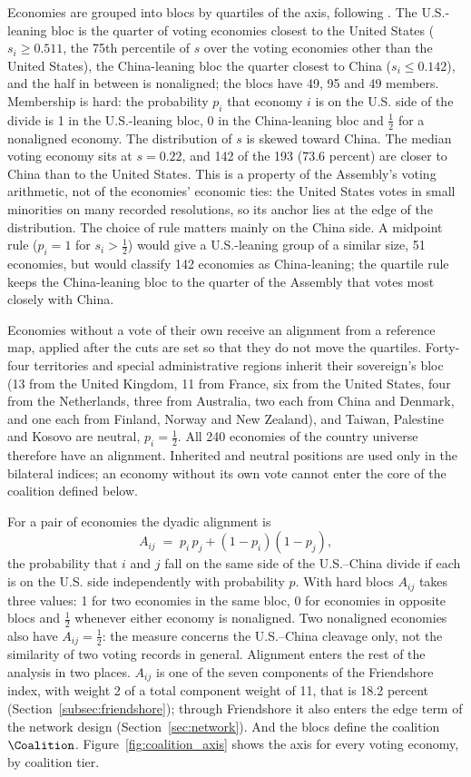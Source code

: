Economies are grouped into blocs by quartiles of the axis, following \citet{gopinath2025changing}.
The U.S.-leaning bloc is the quarter of voting economies closest to the United States
($s_i\geq 0.511$, the 75th percentile of $s$ over the voting economies other than the United
States), the China-leaning bloc the quarter closest to China ($s_i\leq 0.142$), and the half in
between is nonaligned; the blocs have 49, 95 and 49 members. Membership is hard: the probability
$p_i$ that economy $i$ is on the U.S. side of the divide is 1 in the U.S.-leaning bloc, 0 in the
China-leaning bloc and $\tfrac12$ for a nonaligned economy. The distribution of $s$ is skewed
toward China. The median voting economy sits at $s=0.22$, and 142 of the 193 (73.6 percent) are
closer to China than to the United States. This is a property of the Assembly's voting
arithmetic, not of the economies' economic ties: the United States votes in small minorities on
many recorded resolutions, so its anchor lies at the edge of the distribution. The choice of rule
matters mainly on the China side. A midpoint rule ($p_i=1$ for $s_i>\tfrac12$) would give a
U.S.-leaning group of a similar size, 51 economies, but would classify 142 economies as
China-leaning; the quartile rule keeps the China-leaning bloc to the quarter of the Assembly that
votes most closely with China.

Economies without a vote of their own receive an alignment from a reference map, applied after
the cuts are set so that they do not move the quartiles. Forty-four territories and special
administrative regions inherit their sovereign's bloc (13 from the United Kingdom, 11 from
France, six from the United States, four from the Netherlands, three from Australia, two each
from China and Denmark, and one each from Finland, Norway and New Zealand), and Taiwan, Palestine
and Kosovo are neutral, $p_i=\tfrac12$. All 240 economies of the country universe therefore have
an alignment. Inherited and neutral positions are used only in the bilateral indices; an economy
without its own vote cannot enter the core of the coalition defined below.

For a pair of economies the dyadic alignment is
\begin{equation}\label{eq:coalition_dyadic}
  A_{ij} \;=\; p_i\,p_j + (1-p_i)(1-p_j),
\end{equation}
the probability that $i$ and $j$ fall on the same side of the U.S.--China divide if each is on
the U.S. side independently with probability $p$. With hard blocs $A_{ij}$ takes three values:
1 for two economies in the same bloc, 0 for economies in opposite blocs and $\tfrac12$ whenever
either economy is nonaligned. Two nonaligned economies also have $A_{ij}=\tfrac12$: the measure
concerns the U.S.--China cleavage only, not the similarity of two voting records in general.
Alignment enters the rest of the analysis in two places. $A_{ij}$ is one of the seven components
of the Friendshore index, with weight 2 of a total component weight of 11, that is 18.2 percent
(Section~\ref{subsec:friendshore}); through Friendshore it also enters the edge term of the
network design (Section~\ref{sec:network}). And the blocs define the coalition $\Coalition$.
Figure~\ref{fig:coalition_axis} shows the axis for every voting economy, by coalition tier.

